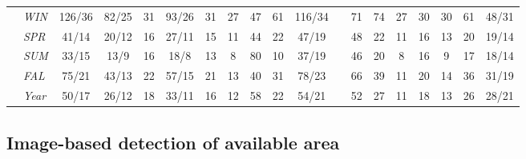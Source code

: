 \begin{table}[htb]
{\begin{tabular}{llccccccccclccccccc}
\parbox[t]{2mm}{}  & \textit{WIN}     & 126/36      & 82/25       & 31          & 93/26       & 31          & 27          & 47          & 61          & 116/34      &  & 71         & 74         & 27         & 30          & 30          & 61          & 48/31                         \\
                        & \textit{SPR}     & 41/14       & 20/12       & 16          & 27/11       & 15          & 11          & 44          & 22          & 47/19       &  & 48         & 22         & 11         & 16          & 13          & 20          & 19/14                         \\
                        & \textit{SUM}     & 33/15       & 13/9        & 16          & 18/8        & 13          & 8           & 80          & 10          & 37/19       &  & 46         & 20         & 8          & 16          & 9           & 17          & 18/14                         \\
                        & \textit{FAL}     & 75/21       & 43/13       & 22          & 57/15       & 21          & 13          & 40          & 31          & 78/23       &  & 66         & 39         & 11         & 20          & 14          & 36          & 31/19                         \\
                        & \textit{Year}    & 50/17       & 26/12       & 18          & 33/11       & 16          & 12          & 58          & 22          & 54/21       &  & 52         & 27         & 11         & 18          & 13          & 26          & 28/21                         \\ \hline
\end{tabular}
}
\end{table}

\subsection{Image-based detection of available area}

